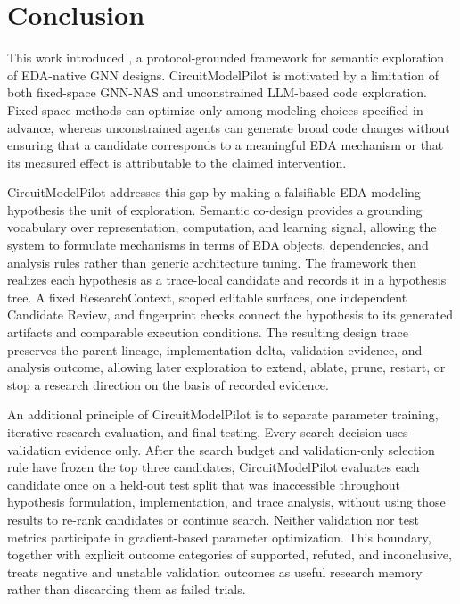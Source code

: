 \section{Conclusion}
\label{conclusion}

This work introduced \sysname, a protocol-grounded framework for semantic exploration of EDA-native GNN designs. CircuitModelPilot is motivated by a limitation of both fixed-space GNN-NAS and unconstrained LLM-based code exploration. Fixed-space methods can optimize only among modeling choices specified in advance, whereas unconstrained agents can generate broad code changes without ensuring that a candidate corresponds to a meaningful EDA mechanism or that its measured effect is attributable to the claimed intervention.

CircuitModelPilot addresses this gap by making a falsifiable EDA modeling hypothesis the unit of exploration. Semantic co-design provides a grounding vocabulary over representation, computation, and learning signal, allowing the system to formulate mechanisms in terms of EDA objects, dependencies, and analysis rules rather than generic architecture tuning. The framework then realizes each hypothesis as a trace-local candidate and records it in a hypothesis tree. A fixed ResearchContext, scoped editable surfaces, one independent Candidate Review, and fingerprint checks connect the hypothesis to its generated artifacts and comparable execution conditions. The resulting design trace preserves the parent lineage, implementation delta, validation evidence, and analysis outcome, allowing later exploration to extend, ablate, prune, restart, or stop a research direction on the basis of recorded evidence.

An additional principle of CircuitModelPilot is to separate parameter training, iterative research evaluation, and final testing. Every search decision uses validation evidence only. After the search budget and validation-only selection rule have frozen the top three candidates, CircuitModelPilot evaluates each candidate once on a held-out test split that was inaccessible throughout hypothesis formulation, implementation, and trace analysis, without using those results to re-rank candidates or continue search. Neither validation nor test metrics participate in gradient-based parameter optimization. This boundary, together with explicit outcome categories of supported, refuted, and inconclusive, treats negative and unstable validation outcomes as useful research memory rather than discarding them as failed trials.

